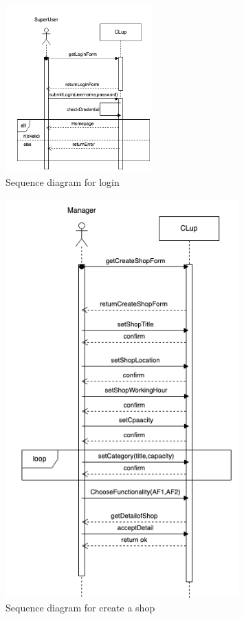 \begin{figure}[H]
  \centering
  \includegraphics[width=0.5\textwidth,keepaspectratio]{images/login_sd.png}
  \caption{Sequence diagram for login}
\end{figure}

\begin{figure}[H]
  \centering
  \includegraphics[width=0.8\textwidth,keepaspectratio]{images/CreateShop_sd.png}
  \caption{Sequence diagram for create a shop}
\end{figure}

